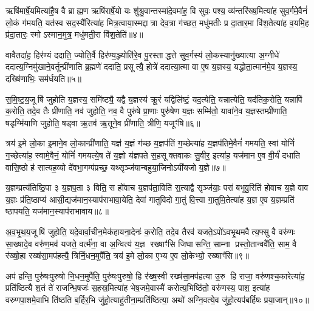 ऋषि॑मार्\mbox{}षे॒यमित्या॑है॒ष वै ब्राह्म॒ण ऋषि॑रार्\mbox{}षे॒यो यः शु॑श्रु॒वान्तस्मा॑दे॒वमा॑ह॒ वि सुवः॒ पश्य॒ व्य॑न्तरि॑ख्ष॒मित्या॑ह सुव॒र्गमे॒वैनं॑ लो॒कं ग॑मयति॒ यत॑स्व सद॒स्यै॑रित्या॑ह मित्र॒त्वाया॒स्मद्दात्रा देव॒त्रा ग॑च्छत॒ मधु॑मतीः प्र दा॒तार॒मा वि॑श॒तेत्या॑ह व॒यमि॒ह प्र॑दा॒तारः॒ स्मोऽस्मान॒मुत्र॒ मधु॑मती॒रा वि॑श॒तेति॑॥४॥

वावैतदा॑ह॒ हिर॑ण्यं ददाति॒ ज्योति॒र्वै हिर॑ण्य॒ञ्ज्योति॑रे॒व पु॒रस्ताद्धत्ते सुव॒र्गस्य॑ लो॒कस्यानु॑ख्यात्या अ॒ग्नीधे॑ ददात्य॒ग्निमु॑खाने॒वर्तून्प्री॑णाति ब्र॒ह्मणे॑ ददाति॒ प्रसूत्यै॒ होत्रे॑ ददात्या॒त्मा वा ए॒ष य॒ज्ञस्य॒ यद्धोता॒त्मान॑मे॒व य॒ज्ञस्य॒ दख्षि॑णाभिः॒ सम॑र्धयति॥५॥

{\anuvakamend[{हिर॑ण्य॒ꣳ॒ राधो॑ राध्यासम॒मुत्र॒ मधु॑मती॒रा वि॑श॒तेत्य॒ष्टात्रिꣳ॑शच्च॥१॥}]}

स॒मि॒ष्ट॒य॒जूषि॑ जुहोति य॒ज्ञस्य॒ समि॑ष्ट्यै॒ यद्वै य॒ज्ञस्य॑ क्रू॒रं यद्विलि॑ष्टं॒ यद॒त्येति॒ यन्नात्येति॒ यद॑तिक॒रोति॒ यन्नापि॑ क॒रोति॒ तदे॒व तैः प्री॑णाति॒ नव॑ जुहोति॒ नव॒ वै पुरु॑षे प्रा॒णाः पुरु॑षेण य॒ज्ञः सम्मि॑तो॒ यावा॑ने॒व य॒ज्ञस्तम्प्री॑णाति॒ षडृग्मि॑याणि जुहोति॒ षड्वा ऋ॒तव॑ ऋ॒तूने॒व प्री॑णाति॒ त्रीणि॒ यजूꣳ॑षि॥६॥

त्रय॑ इ॒मे लो॒का इ॒माने॒व लो॒कान्प्री॑णाति॒ यज्ञ॑ य॒ज्ञं ग॑च्छ य॒ज्ञप॑तिं ग॒च्छेत्या॑ह य॒ज्ञप॑तिमे॒वैनं॑ गमयति॒ स्वां योनिं॑ ग॒च्छेत्या॑ह॒ स्वामे॒वैनं॒ योनिं॑ गमयत्ये॒ष ते॑ य॒ज्ञो य॑ज्ञपते स॒हसूक्तवाकः सु॒वीर॒ इत्या॑ह॒ यज॑मान ए॒व वी॒र्यं॑ दधाति वासि॒ष्ठो ह॑ सात्यह॒व्यो दे॑वभा॒गम्प॑प्रच्छ॒ यथ्सृञ्ज॑यान्बहुया॒जिनोऽयी॑यजो य॒ज्ञे॥७॥

य॒ज्ञम्प्रत्य॑तिष्ठि॒पा ३ य॒ज्ञप॒ता ३ विति॒ स हो॑वाच य॒ज्ञप॑ता॒विति॑ स॒त्याद्वै सृञ्ज॑याः॒ परा॑ बभूवु॒रिति॑ होवाच य॒ज्ञे वाव य॒ज्ञः प्र॑ति॒ष्ठाप्य॑ आसी॒द्यज॑मान॒स्याप॑राभावा॒येति॒ देवा॑ गातुविदो गा॒तुं वि॒त्त्वा गा॒तुमि॒तेत्या॑ह य॒ज्ञ ए॒व य॒ज्ञम्प्रति॑ ष्ठापयति॒ यज॑मान॒स्याप॑राभावाय॥८॥

{\anuvakamend[{यजूꣳ॑षि य॒ज्ञ एक॑चत्वारिशच्च॥२॥}]}

अ॒व॒भृ॒थ॒य॒जूषि॑ जुहोति॒ यदे॒वार्वा॒चीन॒मेक॑हायना॒देनः॑ क॒रोति॒ तदे॒व तैरव॑ यजते॒ऽपो॑ऽवभृ॒थमवैत्य॒फ्सु वै वरु॑णः सा॒ख्षादे॒व वरु॑ण॒मव॑ यजते॒ वर्त्म॑ना॒ वा अ॒न्वित्य॑ य॒ज्ञ रख्षाꣳ॑सि जिघासन्ति॒ साम्ना प्रस्तो॒तान्ववै॑ति॒ साम॒ वै र॑ख्षो॒हा रख्ष॑सा॒मप॑हत्यै॒ त्रिर्नि॒धन॒मुपै॑ति॒ त्रय॑ इ॒मे लो॒का ए॒भ्य ए॒व लो॒केभ्यो॒ रख्षाꣳ॑सि॥९॥

अप॑ हन्ति॒ पुरु॑षःपुरुषो नि॒धन॒मुपै॑ति॒ पुरु॑षःपुरुषो॒ हि र॑ख्ष॒स्वी रख्ष॑सा॒मप॑हत्या उ॒रु हि राजा॒ वरु॑णश्च॒कारेत्या॑ह॒ प्रति॑ष्ठित्यै श॒तं ते॑ राजन्भि॒षजः॑ स॒हस्र॒मित्या॑ह भेष॒जमे॒वास्मै॑ करोत्य॒भिष्ठि॑तो॒ वरु॑णस्य॒ पाश॒ इत्या॑ह वरुणपा॒शमे॒वाभि ति॑ष्ठति ब॒र्\mbox{}हिर॒भि जु॑हो॒त्याहु॑तीना॒म्प्रति॑ष्ठित्या॒ अथो॑ अग्नि॒वत्ये॒व जु॑हो॒त्यप॑बर्\mbox{}हिषः प्रया॒जान्॥१०॥

